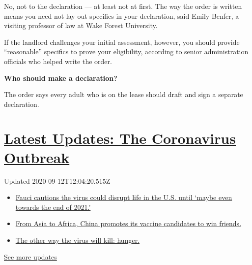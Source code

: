 No, not to the declaration --- at least not at first. The way the order
is written means you need not lay out specifics in your declaration,
said Emily Benfer, a visiting professor of law at Wake Forest
University.

If the landlord challenges your initial assessment, however, you should
provide ``reasonable'' specifics to prove your eligibility, according to
senior administration officials who helped write the order.

\textbf{Who should make a declaration?}

The order says every adult who is on the lease should draft and sign a
separate declaration.

\hypertarget{latest-updates-the-coronavirus-outbreak}{%
\section{\texorpdfstring{\href{https://www.nytimes3xbfgragh.onion/2020/09/11/world/covid-19-coronavirus.html?action=click\&pgtype=Article\&state=default\&region=MAIN_CONTENT_1\&context=storylines_live_updates}{Latest
Updates: The Coronavirus
Outbreak}}{Latest Updates: The Coronavirus Outbreak}}\label{latest-updates-the-coronavirus-outbreak}}

Updated 2020-09-12T12:04:20.515Z

\begin{itemize}
\tightlist
\item
  \href{https://www.nytimes3xbfgragh.onion/2020/09/11/world/covid-19-coronavirus.html?action=click\&pgtype=Article\&state=default\&region=MAIN_CONTENT_1\&context=storylines_live_updates\#link-dfb8a16}{Fauci
  cautions the virus could disrupt life in the U.S. until `maybe even
  towards the end of 2021.'}
\item
  \href{https://www.nytimes3xbfgragh.onion/2020/09/11/world/covid-19-coronavirus.html?action=click\&pgtype=Article\&state=default\&region=MAIN_CONTENT_1\&context=storylines_live_updates\#link-7104d154}{From
  Asia to Africa, China promotes its vaccine candidates to win friends.}
\item
  \href{https://www.nytimes3xbfgragh.onion/2020/09/11/world/covid-19-coronavirus.html?action=click\&pgtype=Article\&state=default\&region=MAIN_CONTENT_1\&context=storylines_live_updates\#link-393ad215}{The
  other way the virus will kill: hunger.}
\end{itemize}

\href{https://www.nytimes3xbfgragh.onion/2020/09/11/world/covid-19-coronavirus.html?action=click\&pgtype=Article\&state=default\&region=MAIN_CONTENT_1\&context=storylines_live_updates}{See
more updates}

